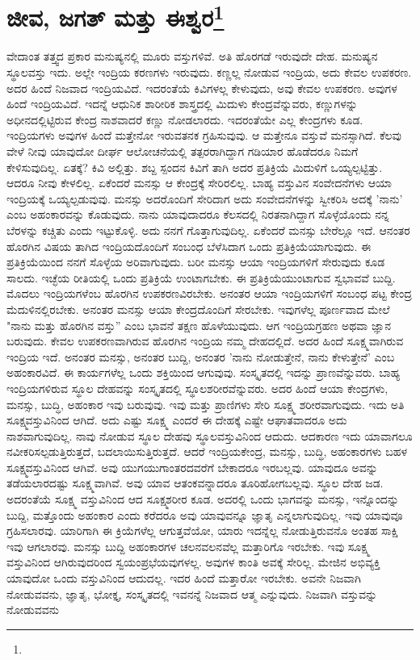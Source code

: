 
\chapter[ಜೀವ, ಜಗತ್ ಮತ್ತು ಈಶ್ವರ]{ಜೀವ, ಜಗತ್ ಮತ್ತು ಈಶ್ವರ\protect\footnote{}}

ವೇದಾಂತ ತತ್ತ್ವದ ಪ್ರಕಾರ ಮನುಷ್ಯನಲ್ಲಿ ಮೂರು ವಸ್ತುಗಳಿವೆ. ಅತಿ ಹೊರಗಡೆ ಇರುವುದೇ ದೇಹ. ಮನುಷ್ಯನ ಸ್ಥೂಲವಸ್ತು ಇದು. ಅಲ್ಲೇ ಇಂದ್ರಿಯ ಕರಣಗಳು ಇರುವುದು. ಕಣ್ಣಲ್ಲ ನೋಡುವ ಇಂದ್ರಿಯ, ಅದು ಕೇವಲ ಉಪಕರಣ. ಅದರ ಹಿಂದೆ ನಿಜವಾದ ಇಂದ್ರಿಯವಿದೆ. ಇದರಂತೆಯೆ ಕಿವಿಗಳಲ್ಲ ಕೇಳುವುದು, ಅವು ಕೇವಲ ಉಪಕರಣ. ಅವುಗಳ ಹಿಂದೆ ಇಂದ್ರಿಯವಿದೆ. ಇದನ್ನೆ ಆಧುನಿಕ ಶಾರೀರಿಕ ಶಾಸ್ತ್ರದಲ್ಲಿ ಮಿದುಳು ಕೇಂದ್ರವೆನ್ನುವರು, ಕಣ್ಣುಗಳನ್ನು ಅಧೀನದಲ್ಲಿಟ್ಟಿರುವ ಕೇಂದ್ರ ನಾಶವಾದರೆ ಕಣ್ಣು ನೋಡಲಾರದು. ಇದರಂತೆಯೇ ಎಲ್ಲ ಕೇಂದ್ರಗಳು ಕೂಡ. ಇಂದ್ರಿಯಗಳು ಅವುಗಳ ಹಿಂದೆ ಮತ್ತೇನೋ ಇರುವತನಕ ಗ್ರಹಿಸುವುವು. ಆ ಮತ್ತೇನೂ ವಸ್ತುವೆ ಮನಸ್ಸಾಗಿದೆ. ಕೆಲವು ವೇಳೆ ನೀವು ಯಾವುದೋ ದೀರ್ಘ ಆಲೋಚನೆಯಲ್ಲಿ ತತ್ಪರರಾಗಿದ್ದಾಗ ಗಡಿಯಾರ ಹೊಡೆದರೂ ನಿಮಗೆ ಕೇಳಿಸುವುದಿಲ್ಲ. ಏತಕ್ಕೆ? ಕಿವಿ ಅಲ್ಲಿತ್ತು. ಶಬ್ದ ಸ್ಪಂದನ ಕಿವಿಗೆ ತಾಗಿ ಅದರ ಪ್ರತಿಕ್ರಿಯೆ ಮಿದುಳಿಗೆ ಒಯ್ಯಲ್ಪಟ್ಟಿತ್ತು. ಆದರೂ ನೀವು ಕೇಳಲಿಲ್ಲ. ಏಕೆಂದರೆ ಮನಸ್ಸು ಆ ಕೇಂದ್ರಕ್ಕೆ ಸೇರಿರಲಿಲ್ಲ. ಬಾಹ್ಯ ವಸ್ತುವಿನ ಸಂವೇದನೆಗಳು ಆಯಾ ಇಂದ್ರಿಯಕ್ಕೆ ಒಯ್ಯಲ್ಪಡುವುವು. ಮನಸ್ಸು ಅದರೊಂದಿಗೆ ಸೇರಿದಾಗ ಅದು ಸಂವೇದನೆಗಳನ್ನು ಸ್ವೀಕರಿಸಿ ಅದಕ್ಕೆ 'ನಾನು' ಎಂಬ ಅಹಂಕಾರವನ್ನು ಕೊಡುವುದು. ನಾನು ಯಾವುದಾದರೂ ಕೆಲಸದಲ್ಲಿ ನಿರತನಾಗಿದ್ದಾಗ ಸೊಳ್ಳೆಯೊಂದು ನನ್ನ ಬೆರಳನ್ನು ಕಚ್ಚಿತು ಎಂದು ಇಟ್ಟುಕೊಳ್ಳಿ. ಅದು ನನಗೆ ಗೊತ್ತಾಗುವುದಿಲ್ಲ. ಏಕೆಂದರೆ ಮನಸ್ಸು ಬೇರೆಲ್ಲೂ ಇದೆ. ಆನಂತರ ಹೊರಗಿನ ವಿಷಯ ತಾಗಿದ ಇಂದ್ರಿಯದೊಂದಿಗೆ ಸಂಬಂಧ ಬೆಳೆಸಿದಾಗ ಒಂದು ಪ್ರತಿಕ್ರಿಯೆಯಾಗುವುದು. ಈ ಪ್ರತಿಕ್ರಿಯೆಯಿಂದ ನನಗೆ ಸೊಳ್ಳೆಯ ಅರಿವಾಗುವುದು. ಬರೀ ಮನಸ್ಸು ಆಯಾ ಇಂದ್ರಿಯಗಳಿಗೆ ಸೇರುವುದು ಕೂಡ ಸಾಲದು. ಇಚ್ಛೆಯ ರೀತಿಯಲ್ಲಿ ಒಂದು ಪ್ರತಿಕ್ರಿಯೆ ಉಂಟಾಗಬೇಕು. ಈ ಪ್ರತಿಕ್ರಿಯೆಯುಂಟಾಗುವ ಸ್ವಭಾವವೆ ಬುದ್ದಿ. ಮೊದಲು ಇಂದ್ರಿಯಗಳೆಂಬ ಹೊರಗಿನ ಉಪಕರಣವಿರಬೇಕು. ಅನಂತರ ಆಯಾ ಇಂದ್ರಿಯಗಳಿಗೆ ಸಂಬಂಧ ಪಟ್ಟ ಕೇಂದ್ರ ಮೆದುಳಿನಲ್ಲಿರಬೇಕು. ಅನಂತರ ಮನಸ್ಸು ಆಯಾ ಕೇಂದ್ರದೊಂದಿಗೆ ಸೇರಬೇಕು. ಇವುಗಳೆಲ್ಲ ಪೂರ್ಣವಾದ ಮೇಲೆ "ನಾನು ಮತ್ತು ಹೊರಗಿನ ವಸ್ತು” ಎಂಬ ಭಾವನೆ ತಕ್ಷಣ ಹೊಳೆಯುವುದು. ಆಗ ಇಂದ್ರಿಯಗ್ರಹಣ ಅಥವಾ ಜ್ಞಾನ ಬರುವುದು. ಕೇವಲ ಉಪಕರಣವಾಗಿರುವ ಹೊರಗಿನ ಇಂದ್ರಿಯ ನಮ್ಮ ದೇಹದಲ್ಲಿದೆ. ಅದರ ಹಿಂದೆ ಸೂಕ್ಷ್ಮವಾಗಿರುವ ಇಂದ್ರಿಯ ಇದೆ. ಅನಂತರ ಮನಸ್ಸು, ಅನಂತರ ಬುದ್ದಿ, ಅನಂತರ 'ನಾನು ನೋಡುತ್ತೇನೆ, ನಾನು ಕೇಳುತ್ತೇನೆ' ಎಂಬ ಅಹಂಕಾರವಿದೆ. ಈ ಕಾರ್ಯಗಳೆಲ್ಲ ಒಂದು ಶಕ್ತಿಯಿಂದ ಆಗುವುವು. ಸಂಸ್ಕೃತದಲ್ಲಿ ಇದನ್ನು ಪ್ರಾಣವೆನ್ನುವರು. ಬಾಹ್ಯ ಇಂದ್ರಿಯಗಳಿರುವ ಸ್ಥೂಲ ದೇಹವನ್ನು ಸಂಸ್ಕೃತದಲ್ಲಿ ಸ್ಥೂಲಶರೀರವೆನ್ನುವರು. ಅದರ ಹಿಂದೆ ಆಯಾ ಕೇಂದ್ರಗಳು, ಮನಸ್ಸು, ಬುದ್ಧಿ, ಅಹಂಕಾರ ಇವು ಬರುವುವು. ಇವು ಮತ್ತು ಪ್ರಾಣಿಗಳು ಸೇರಿ ಸೂಕ್ಷ್ಮ ಶರೀರವಾಗುವುದು. ಇದು ಅತಿ ಸೂಕ್ಷ್ಮವಸ್ತುವಿನಿಂದ ಆಗಿದೆ. ಅದು ಎಷ್ಟು ಸೂಕ್ಷ್ಮ ಎಂದರೆ ಈ ದೇಹಕ್ಕೆ ಎಷ್ಟೇ ಆಘಾತವಾದರೂ ಅದು ನಾಶವಾಗುವುದಿಲ್ಲ. ನಾವು ನೋಡುವ ಸ್ಥೂಲ ದೇಹವು ಸ್ಥೂಲವಸ್ತುವಿನಿಂದ ಆದುದು. ಆದಕಾರಣ ಇದು ಯಾವಾಗಲೂ ನವೀಕರಿಸಲ್ಪಡುತ್ತಿರುತ್ತದೆ, ಬದಲಾಯಿಸುತ್ತಿರುತ್ತದೆ. ಆದರೆ ಇಂದ್ರಿಯಕೇಂದ್ರ, ಮನಸ್ಸು, ಬುದ್ಧಿ, ಅಹಂಕಾರಗಳು ಬಹಳ ಸೂಕ್ಷ್ಮವಸ್ತುವಿನಿಂದ ಆಗಿವೆ. ಅವು ಯುಗಯುಗಾಂತರದವರೆಗೆ ಬೇಕಾದರೂ ಇರಬಲ್ಲವು. ಯಾವುದೂ ಅವನ್ನು ತಡೆಯಲಾರದಷ್ಟು ಸೂಕ್ಷ್ಮವಾಗಿವೆ. ಅವು ಯಾವ ಆತಂಕವನ್ನಾದರೂ ತೂರಿಹೋಗಬಲ್ಲವು. ಸ್ಥೂಲ ದೇಹ ಜಡ. ಅದರಂತೆಯೆ ಸೂಕ್ಷ್ಮ ವಸ್ತುವಿನಿಂದ ಆದ ಸೂಕ್ಷ್ಮಶರೀರ ಕೂಡ. ಅದರಲ್ಲಿ ಒಂದು ಭಾಗವನ್ನು ಮನಸ್ಸು, ಇನ್ನೊಂದನ್ನು ಬುದ್ದಿ, ಮತ್ತೊಂದು ಅಹಂಕಾರ ಎಂದು ಕರೆದರೂ ಅವು ಯಾವುವನ್ನೂ ಜ್ಞಾತೃ ಎನ್ನಲಾಗುವುದಿಲ್ಲ. ಇವು ಯಾವುವೂ ಗ್ರಹಿಸಲಾರವು. ಯಾರಿಗಾಗಿ ಈ ಕ್ರಿಯೆಗಳೆಲ್ಲ ಆಗುತ್ತವೆಯೋ, ಯಾರು ಇದನ್ನೆಲ್ಲ ನೋಡುತ್ತಿರುವನೊ ಅಂತಹ ಸಾಕ್ಷಿ ಇವು ಆಗಲಾರವು. ಮನಸ್ಸು ಬುದ್ದಿ ಅಹಂಕಾರಗಳ ಚಲನವಲನವೆಲ್ಲ ಮತ್ತಾರಿಗೊ ಇರಬೇಕು. ಇವು ಸೂಕ್ಷ್ಮ ವಸ್ತುವಿನಿಂದ ಆಗಿರುವುದರಿಂದ ಸ್ವಯಂಪ್ರಭೆಯವುಗಳಲ್ಲ. ಅವುಗಳ ಕಾಂತಿ ಅವಕ್ಕೆ ಸೇರಿಲ್ಲ. ಮೇಜಿನ ಅಭಿವ್ಯಕ್ತಿ ಯಾವುದೋ ಒಂದು ವಸ್ತುವಿನಿಂದ ಆದುದಲ್ಲ. ಇದರ ಹಿಂದೆ ಮತ್ತಾರೋ ಇರಬೇಕು. ಅವನೇ ನಿಜವಾಗಿ ನೋಡುವವನು, ಜ್ಞಾತೃ, ಭೋಕ್ತೃ, ಸಂಸ್ಕೃತದಲ್ಲಿ ಇವನನ್ನೆ ನಿಜವಾದ ಆತ್ಮ ಎನ್ನುವುದು. ನಿಜವಾಗಿ ವಸ್ತುವನ್ನು ನೋಡುವವನು 